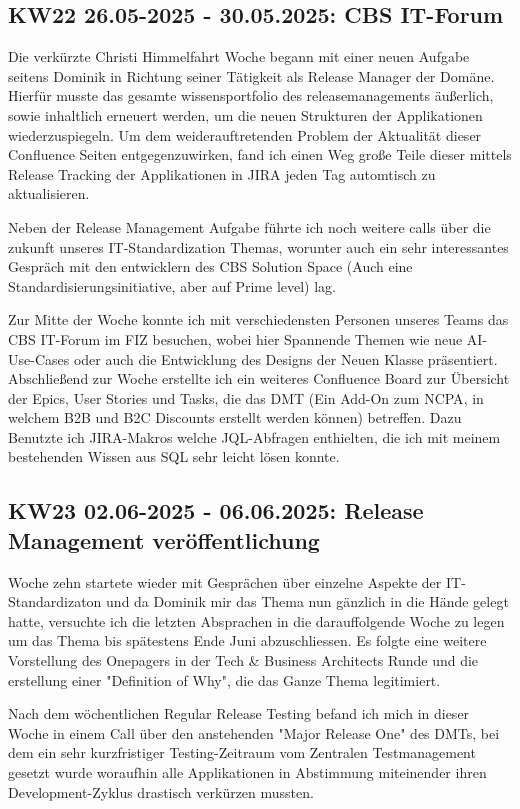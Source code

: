 \subsection{KW22 26.05-2025 - 30.05.2025: CBS IT-Forum}
Die verkürzte Christi Himmelfahrt Woche begann mit einer neuen Aufgabe seitens Dominik in Richtung seiner Tätigkeit als Release Manager der Domäne. 
Hierfür musste das gesamte wissensportfolio des releasemanagements äußerlich, sowie inhaltlich erneuert werden, um die neuen Strukturen der Applikationen wiederzuspiegeln.
Um dem weiderauftretenden Problem der Aktualität dieser Confluence Seiten entgegenzuwirken, fand ich einen Weg große Teile dieser mittels Release Tracking der Applikationen in JIRA jeden Tag automtisch zu aktualisieren.

Neben der Release Management Aufgabe führte ich noch weitere calls über die zukunft unseres IT-Standardization Themas, worunter auch ein sehr interessantes Gespräch mit den entwicklern des CBS Solution Space (Auch eine Standardisierungsinitiative, aber auf Prime level) lag.

Zur Mitte der Woche konnte ich mit verschiedensten Personen unseres Teams das CBS IT-Forum im \ac{FIZ} besuchen, wobei hier Spannende Themen wie neue AI-Use-Cases oder auch die Entwicklung des Designs der Neuen Klasse präsentiert.
Abschließend zur Woche erstellte ich ein weiteres Confluence Board zur Übersicht der Epics, User Stories und Tasks, die das \ac{DMT} (Ein Add-On zum \ac{NCPA}, in welchem B2B und B2C Discounts erstellt werden können) betreffen. 
Dazu Benutzte ich JIRA-Makros welche \ac{JQL}-Abfragen enthielten, die ich mit meinem bestehenden Wissen aus \ac{SQL} sehr leicht lösen konnte. 


\subsection{KW23 02.06-2025 - 06.06.2025: Release Management veröffentlichung}
Woche zehn startete wieder mit Gesprächen über einzelne Aspekte der IT-Standardizaton und da Dominik mir das Thema nun gänzlich in die Hände gelegt hatte, versuchte ich die letzten Absprachen in die darauffolgende Woche zu legen um das Thema bis spätestens Ende Juni abzuschliessen.
Es folgte eine weitere Vorstellung des Onepagers in der Tech \& Business Architects Runde und die erstellung einer "Definition of Why", die das Ganze Thema legitimiert.

Nach dem wöchentlichen Regular Release Testing befand ich mich in dieser Woche in einem Call über den anstehenden "Major Release One" des \acp{DMT}, bei dem ein sehr kurzfristiger Testing-Zeitraum vom Zentralen Testmanagement gesetzt wurde woraufhin alle Applikationen in Abstimmung miteinender ihren Development-Zyklus drastisch verkürzen mussten.

